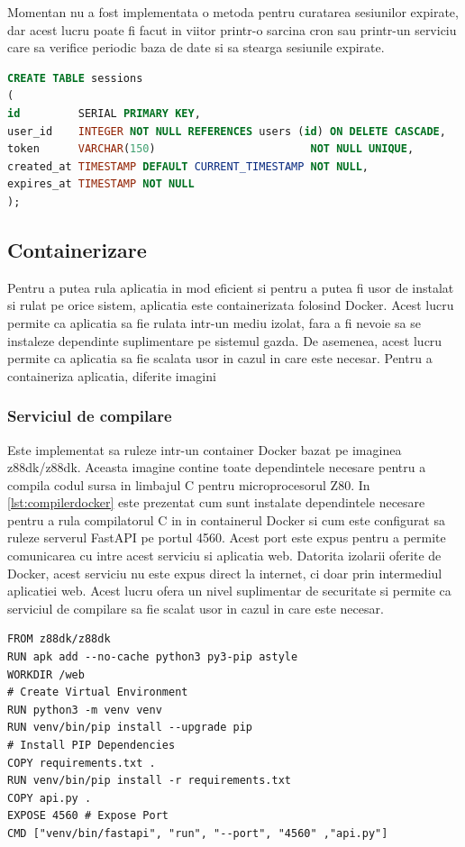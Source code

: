 \documentclass[titlepage,12pt]{article}
\DeclareRobustCommand{\code}[1]{{\ttfamily\small #1}}
\begin{document}
Momentan nu a fost implementata o metoda pentru curatarea sesiunilor expirate, dar acest lucru poate fi facut in viitor printr-o sarcina \code{cron} sau printr-un serviciu care sa verifice periodic baza de date si sa stearga sesiunile expirate.

\begin{lstlisting}[language=SQL,caption={Tabelele \code{sessions} din baza de date},label={lst:sessionsdb}]
CREATE TABLE sessions
(
id         SERIAL PRIMARY KEY,
user_id    INTEGER NOT NULL REFERENCES users (id) ON DELETE CASCADE,
token      VARCHAR(150)                        NOT NULL UNIQUE,
created_at TIMESTAMP DEFAULT CURRENT_TIMESTAMP NOT NULL,
expires_at TIMESTAMP NOT NULL
);
\end{lstlisting}

\subsection{Containerizare}
Pentru a putea rula aplicatia in mod eficient si pentru a putea fi usor de instalat si rulat pe orice sistem, aplicatia este containerizata folosind Docker. Acest lucru permite ca aplicatia sa fie rulata intr-un mediu izolat, fara a fi nevoie sa se instaleze dependinte suplimentare pe sistemul gazda. De asemenea, acest lucru permite ca aplicatia sa fie scalata usor in cazul in care este necesar.
Pentru a containeriza aplicatia, diferite imagini

\subsubsection{Serviciul de compilare}
Este implementat sa ruleze intr-un container Docker bazat pe imaginea \code {z88dk/z88dk}. Aceasta imagine contine toate dependintele necesare pentru a compila codul sursa in limbajul C pentru microprocesorul Z80.
In \cref{lst:compilerdocker} este prezentat cum sunt instalate dependintele necesare pentru a rula compilatorul C in in containerul Docker si cum este configurat sa ruleze serverul FastAPI pe portul 4560. Acest port este expus pentru a permite comunicarea cu intre acest serviciu si aplicatia web. Datorita izolarii oferite de Docker, acest serviciu nu este expus direct la internet, ci doar prin intermediul aplicatiei web. Acest lucru ofera un nivel suplimentar de securitate si permite ca serviciul de compilare sa fie scalat usor in cazul in care este necesar.

\begin{lstlisting}[language=docker,caption={Dockerfile pentru compilatorul C},label={lst:compilerdocker}]
FROM z88dk/z88dk
RUN apk add --no-cache python3 py3-pip astyle
WORKDIR /web
# Create Virtual Environment
RUN python3 -m venv venv
RUN venv/bin/pip install --upgrade pip
# Install PIP Dependencies
COPY requirements.txt .
RUN venv/bin/pip install -r requirements.txt
COPY api.py .
EXPOSE 4560 # Expose Port
CMD ["venv/bin/fastapi", "run", "--port", "4560" ,"api.py"]
\end{lstlisting}
\end{document}
